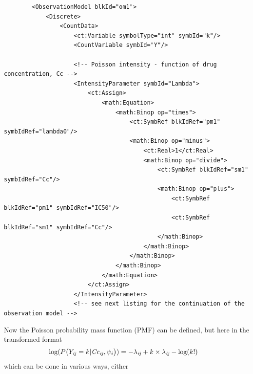 \lstset{language=XML}
\begin{lstlisting}
        <ObservationModel blkId="om1">
            <Discrete>
                <CountData>
                    <ct:Variable symbolType="int" symbId="k"/>
                    <CountVariable symbId="Y"/>
                    
                    <!-- Poisson intensity - function of drug concentration, Cc -->                    
                    <IntensityParameter symbId="Lambda">
                        <ct:Assign>
                            <math:Equation>
                                <math:Binop op="times">
                                    <ct:SymbRef blkIdRef="pm1" symbIdRef="lambda0"/>
                                    <math:Binop op="minus">
                                        <ct:Real>1</ct:Real>
                                        <math:Binop op="divide">
                                            <ct:SymbRef blkIdRef="sm1" symbIdRef="Cc"/>
                                            <math:Binop op="plus">
                                                <ct:SymbRef blkIdRef="pm1" symbIdRef="IC50"/>
                                                <ct:SymbRef blkIdRef="sm1" symbIdRef="Cc"/>
                                            </math:Binop>
                                        </math:Binop>
                                    </math:Binop>
                                </math:Binop>
                            </math:Equation>
                        </ct:Assign>
                    </IntensityParameter>
                    <!-- see next listing for the continuation of the observation model -->
\end{lstlisting}
Now the Poisson probability mass function (PMF) can be defined, but here 
in the transformed format 
\begin{align}
\log(P\big(Y_{\mathit{ij}} & =k | \mathit{Cc}_{\mathit{ij}}, \psi_i\big)) =  -\lambda_{\mathit{ij}} +k\times \lambda_{\mathit{ij}} - \log(k!) \nonumber
\end{align}
which can be done in various ways, either
